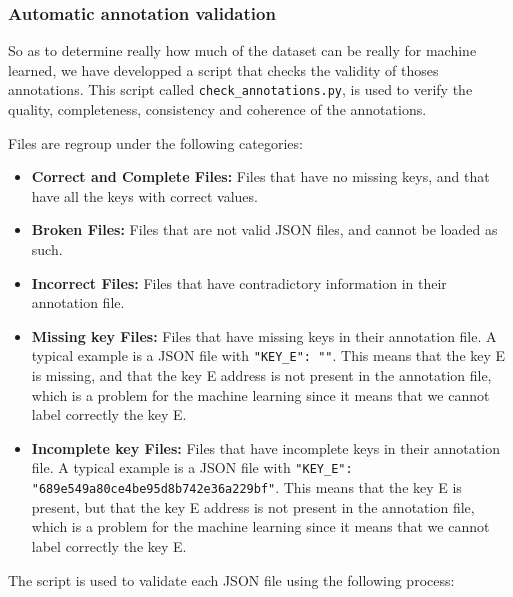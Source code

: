     \subsubsection{Automatic annotation validation}
    So as to determine really how much of the dataset can be really for machine learned, we have developped a script that checks the validity of thoses annotations. This script called \texttt{check\_annotations.py}, is used to verify the quality, completeness, consistency and coherence of the annotations.

    Files are regroup under the following categories:

    \begin{itemize}
        \item \textbf{Correct and Complete Files:} Files that have no missing keys, and that have all the keys with correct values.
        \item \textbf{Broken Files:} Files that are not valid JSON files, and cannot be loaded as such.
        \item \textbf{Incorrect Files:} Files that have contradictory information in their annotation file.
        \item \textbf{Missing key Files:} Files that have missing keys in their annotation file. A typical example is a JSON file with \lstinline[style=json]!"KEY_E": ""!. This means that the key E is missing, and that the key E address is not present in the annotation file, which is a problem for the machine learning since it means that we cannot label correctly the key E.
        \item \textbf{Incomplete key Files:} Files that have incomplete keys in their annotation file. A typical example is a JSON file with \lstinline[style=json]!"KEY_E": "689e549a80ce4be95d8b742e36a229bf"!. This means that the key E is present, but that the key E address is not present in the annotation file, which is a problem for the machine learning since it means that we cannot label correctly the key E.
    \end{itemize}

    The script is used to validate each JSON file using the following process:

